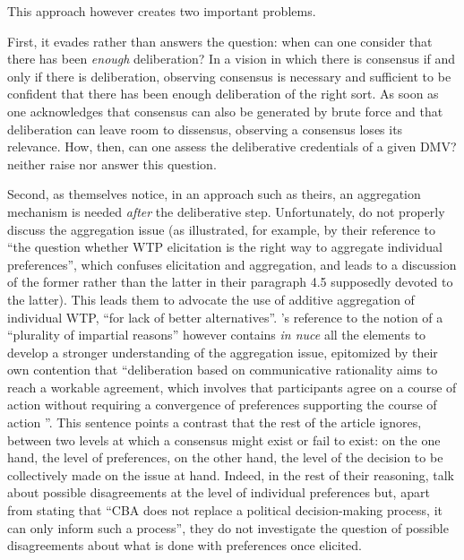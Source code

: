 \documentclass[version=3.21, pagesize, twoside=off, bibliography=totoc, DIV=calc, fontsize=12pt, a4paper, french, english]{scrartcl}
\begin{document}
This approach however creates two important problems.

First, it evades rather than answers the question: when can one consider that there has been \emph{enough} deliberation? 
In a vision in which there is consensus if and only if there is deliberation, observing consensus is necessary and sufficient to be confident that there has been enough deliberation of the right sort. 
As soon as one acknowledges that consensus can also be generated by brute force and that deliberation can leave room to dissensus, observing a consensus loses its relevance. 
How, then, can one assess the deliberative credentials of a given DMV? 
\citet{bartkowski_beyond_2018}  neither raise nor answer this question.

Second, as \citet{bartkowski_beyond_2018} themselves notice, in an approach such as theirs, an aggregation mechanism is needed \emph{after} the deliberative step. 
Unfortunately, \citet{bartkowski_beyond_2018} do not properly discuss the aggregation issue (as illustrated, for example, by their reference to ``the question whether WTP elicitation is the right way to aggregate individual preferences'', which confuses elicitation and aggregation, and leads to a discussion of the former rather than the latter in their paragraph 4.5 supposedly devoted to the latter). 
This leads them to advocate the use of additive aggregation of individual WTP, ``for lack of better alternatives''. 
\citet{bartkowski_beyond_2018}'s reference to the notion of a ``plurality of impartial reasons'' however contains \emph{in nuce} all the elements to develop a stronger understanding of the aggregation issue, epitomized by their own contention that ``deliberation based on communicative rationality aims to reach a workable agreement, which involves that participants agree on a course of action without requiring a convergence of preferences supporting the course of action \citep{dryzek_deliberative_2002}''. 
This sentence points a contrast that the rest of the article ignores, between two levels at which a consensus might exist or fail to exist: on the one hand, the level of preferences, on the other hand, the level of the decision to be collectively made on the issue at hand. 
Indeed, in the rest of their reasoning, \citet{bartkowski_beyond_2018} talk about possible disagreements at the level of individual preferences but, apart from stating that ``CBA  does not replace a political decision-making process, it can only inform such a process'', they do not investigate the question of possible disagreements about what is done with preferences once elicited.  
\end{document}
